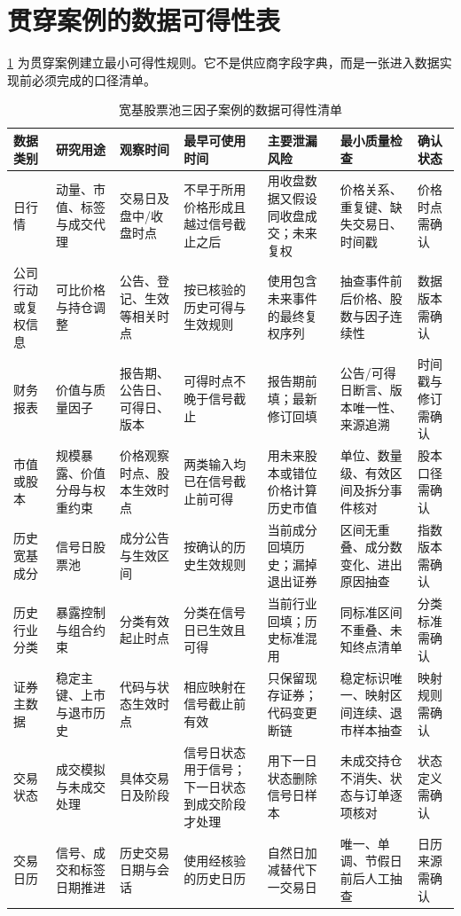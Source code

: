 \section{贯穿案例的数据可得性表}

\cref{tab:ch02-data-availability} 为贯穿案例建立最小可得性规则。它不是供应商字段字典，而是一张进入数据实现前必须完成的口径清单。

\begingroup
\scriptsize
\setlength{\tabcolsep}{2.5pt}
\begin{longtable}{@{}p{}p{}p{}p{}p{}p{}p{}@{}}
\caption{宽基股票池三因子案例的数据可得性清单}\label{tab:ch02-data-availability}\\
\toprule
数据类别 & 研究用途 & 观察时间 & 最早可使用时间 & 主要泄漏风险 & 最小质量检查 & 确认状态 \\
\midrule
\endhead
日行情 & 动量、市值、标签与成交代理 & 交易日及盘中/收盘时点 & 不早于所用价格形成且越过信号截止之后 & 用收盘数据又假设同收盘成交；未来复权 & 价格关系、重复键、缺失交易日、时间戳 & 价格时点需确认 \\
公司行动或复权信息 & 可比价格与持仓调整 & 公告、登记、生效等相关时点 & 按已核验的历史可得与生效规则 & 使用包含未来事件的最终复权序列 & 抽查事件前后价格、股数与因子连续性 & 数据版本需确认 \\
财务报表 & 价值与质量因子 & 报告期、公告日、可得日、版本 & 可得时点不晚于信号截止 & 报告期前填；最新修订回填 & 公告/可得日断言、版本唯一性、来源追溯 & 时间戳与修订需确认 \\
市值或股本 & 规模暴露、价值分母与权重约束 & 价格观察时点、股本生效时点 & 两类输入均已在信号截止前可得 & 用未来股本或错位价格计算历史市值 & 单位、数量级、有效区间及拆分事件核对 & 股本口径需确认 \\
历史宽基成分 & 信号日股票池 & 成分公告与生效区间 & 按确认的历史生效规则 & 当前成分回填历史；漏掉退出证券 & 区间无重叠、成分数变化、进出原因抽查 & 指数版本需确认 \\
历史行业分类 & 暴露控制与组合约束 & 分类有效起止时点 & 分类在信号日已生效且可得 & 当前行业回填；历史标准混用 & 同标准区间不重叠、未知终点清单 & 分类标准需确认 \\
证券主数据 & 稳定主键、上市与退市历史 & 代码与状态生效时点 & 相应映射在信号截止前有效 & 只保留现存证券；代码变更断链 & 稳定标识唯一、映射区间连续、退市样本抽查 & 映射规则需确认 \\
交易状态 & 成交模拟与未成交处理 & 具体交易日及阶段 & 信号日状态用于信号；下一日状态到成交阶段才处理 & 用下一日状态删除信号日样本 & 未成交持仓不消失、状态与订单逐项核对 & 状态定义需确认 \\
交易日历 & 信号、成交和标签日期推进 & 历史交易日期与会话 & 使用经核验的历史日历 & 自然日加减替代下一交易日 & 唯一、单调、节假日前后人工抽查 & 日历来源需确认 \\
\bottomrule
\end{longtable}
\endgroup

